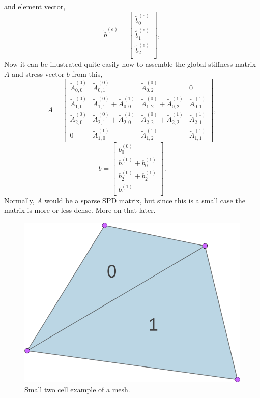 and element vector,
\begin{equation}\label{elemvec}
	\widetilde{b}^{(e)} =
	\left[\begin{matrix}
		\widetilde{b}^{(e)}_0 \\
		\widetilde{b}^{(e)}_1 \\
		\widetilde{b}^{(e)}_2 \\
	\end{matrix}\right],
\end{equation}
Now it can be illustrated quite easily how to assemble the global stiffness matrix $A$ and stress vector $b$ from this,
\begin{equation}
	A =
	\left[\begin{matrix} 
		\widetilde{A}^{(0)}_{0,0} & \widetilde{A}^{(0)}_{0,1} & \widetilde{A}^{(0)}_{0,2} & 0 \\
		\widetilde{A}^{(0)}_{1,0} & \widetilde{A}^{(0)}_{1,1} + \widetilde{A}^{(1)}_{0,0}  & \widetilde{A}^{(0)}_{1,2} + \widetilde{A}^{(1)}_{0,2} & \widetilde{A}^{(1)}_{0,1} \\
		\widetilde{A}^{(0)}_{2,0} & \widetilde{A}^{(0)}_{2,1} + \widetilde{A}^{(1)}_{2,0} & \widetilde{A}^{(0)}_{2,2} + \widetilde{A}^{(1)}_{2,2} & \widetilde{A}^{(1)}_{2,1} \\
		0 & \widetilde{A}^{(1)}_{1,0} & \widetilde{A}^{(1)}_{1,2} & \widetilde{A}^{(1)}_{1,1}
	\end{matrix}\right],
\end{equation}
\begin{equation}
	b =
	\left[\begin{matrix}
		b^{(0)}_0 \\
		b^{(0)}_1 + b^{(1)}_0 \\
		b^{(0)}_2 + b^{(1)}_2 \\
		b^{(1)}_1
	\end{matrix}\right].
\end{equation}
Normally, $A$ would be a sparse SPD matrix, but since this is a small case the matrix is more or less dense. More on that later.
\begin{figure}
	\centering
	\includegraphics[width = 0.4\linewidth]{Figures/2cell.png}
	\caption{Small two cell example of a mesh.}
	\label{fig:2cell}
\end{figure}
